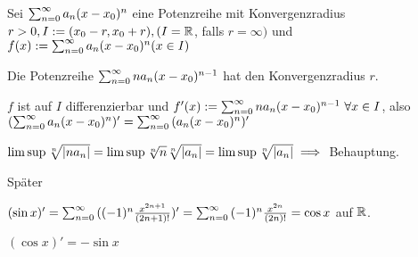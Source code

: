 \documentclass[a4paper,oneside,DIV15,BCOR12mm]{scrbook}
\begin{document}
\begin{satz}
Sei $\sum_{n=0}^{\infty}{a_n(x-x_0)^n}$ eine Potenzreihe mit Konvergenzradius $r>0, I:=(x_0-r, x_0+r), (I=\mathbb{R}$, falls $r=\infty)$ und $f(x):=\sum_{n=0}^{\infty}{a_n(x-x_0)^n} (x \in I)$
\begin{liste}
\item Die Potenzreihe $\sum_{n=0}^{\infty}{na_n(x-x_0)^{n-1}}$ hat den Konvergenzradius $r$.
\item $f$ ist auf $I$ differenzierbar und $f'(x):=\sum_{n=0}^{\infty}{na_n(x-x_0)^{n-1}}\ \forall x \in I$, also $(\sum_{n=0}^{\infty}{a_n(x-x_0)^n})' = \sum_{n=0}^{\infty}{(a_n(x-x_0)^n)'}$
\end{liste}
\end{satz}

\begin{beweise}
\item $\limsup \sqrt[n]{|na_n|}=\limsup \sqrt[n]{n}\sqrt[n]{|a_n|}=\limsup \sqrt[n]{|a_n|} \implies$ Behauptung.
\item Später
\end{beweise}

\begin{beispiele}
\item $(\sin x)' = \sum_{n=0}^{\infty}{((-1)^n\frac{x^{2n+1}}{(2n+1)!}})'=\sum_{n=0}^{\infty}{(-1)^n\frac{x^{2n}}{(2n)!}}=\cos x$ auf $\mathbb{R}$.
\item $(\cos x)' = -\sin x$
\end{beispiele}
\end{document}
